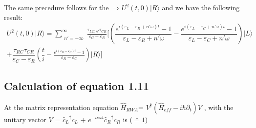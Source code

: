 The same precedure follows for the $\Rightarrow U^{2}(t,0) \vert R \rangle $ and we have the following result:
\\

\begin{multline} \label{eq:23}
U^{2}(t,0) \vert R \rangle = \sum_{\substack{n'=-\infty}}^{\infty} \frac{\overline{\tau}_{LC,n'} {\tau}_{CR}  } { \varepsilon_C -\varepsilon_R } [ \left(  \dfrac{ e^{i ( \varepsilon_L - \varepsilon_R + n'\omega ) t } - 1 } { \varepsilon_L - \varepsilon_R + n'  \omega  } - \dfrac{ e^{i ( \varepsilon_L - \varepsilon_C + n'\omega ) t } - 1 } { \varepsilon_L - \varepsilon_C + n'  \omega  } \right)    \vert L \rangle 
\\
+ \dfrac{ \tau_{RC} \tau_{CR} }{ \varepsilon_C - \varepsilon_R } \left(  \dfrac{t}{i}- \frac{ e^{i ( \varepsilon_R - \varepsilon_C )  t } - 1 } { \varepsilon_R - \varepsilon_C } \right)  \vert R \rangle ] 
\end{multline}

\subsection{Calculation of equation 1.11} \label{subsection1.1.3}

At the matrix representation equation $\widehat{H}_{RWA}$= $V^{\dagger} (\widehat{H}_{eff}-i\hbar\partial_t) V$ , with the unitary vector $V$ = ${\widehat{c}_{L}}^{\dagger} c_{L}$ + $e^{-i\nu\omega t} {\widehat{c}_{R}}^{\dagger} c_{R}$  is ($\bar=1$)

